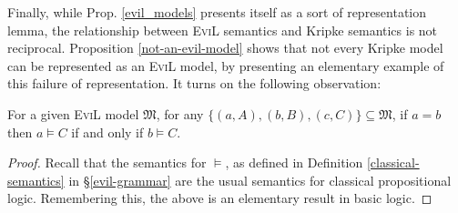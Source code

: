 Finally, while Prop. \ref{evil_models} presents itself as a sort of
representation lemma, the relationship between \textsc{EviL} semantics
and Kripke semantics is not reciprocal.  Proposition
\ref{not-an-evil-model} shows that not every Kripke model can be
represented as an \textsc{EviL} model, 
by presenting an elementary example of  this failure of
representation.  It turns on the following observation:

\begin{lemma}\label{helper-lemma}
  For a given \textsc{EviL} model $\mathfrak{M}$, for any
  $\{(a,A),(b,B),(c,C)\} \subseteq \mathfrak{M}$, if $a = b$ then $a
  \models C$ if and only if $b \models C$.
\end{lemma}
\begin{proof}
  Recall that the semantics for $\models$, as defined in Definition
  \ref{classical-semantics} in \S\ref{evil-grammar} are the usual
  semantics for classical propositional logic. Remembering this, the
  above is an elementary result in basic logic.
\end{proof}

